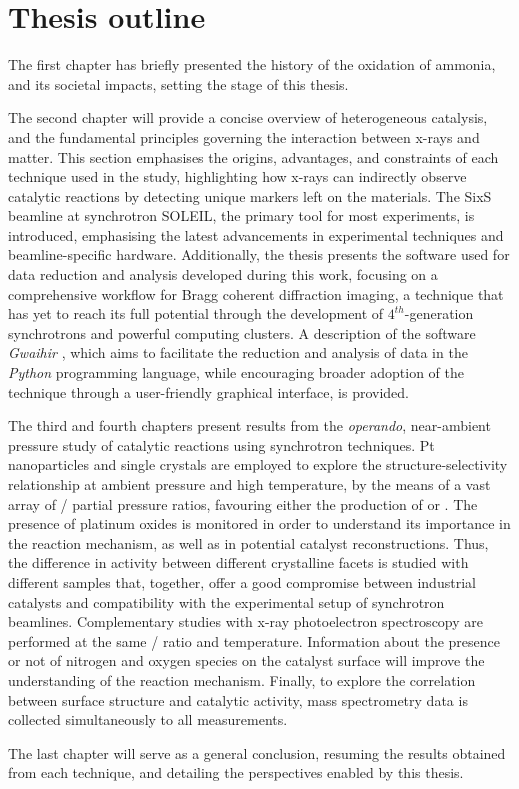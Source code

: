 \section{Thesis outline}

The first chapter has briefly presented the history of the oxidation of ammonia, and its societal impacts, setting the stage of this thesis.

The second chapter will provide a concise overview of heterogeneous catalysis, and the fundamental principles governing the interaction between x-rays and matter.
This section emphasises the origins, advantages, and constraints of each technique used in the study, highlighting how x-rays can indirectly observe catalytic reactions by detecting unique markers left on the materials.
The SixS beamline at synchrotron SOLEIL, the primary tool for most experiments, is introduced, emphasising the latest advancements in experimental techniques and beamline-specific hardware.
Additionally, the thesis presents the software used for data reduction and analysis developed during this work, focusing on a comprehensive workflow for Bragg coherent diffraction imaging, a technique that has yet to reach its full potential through the development of $4^{th}$-generation synchrotrons and powerful computing clusters.
A description of the software \textit{Gwaihir} \parencite{Simonne2022}, which aims to facilitate the reduction and analysis of data in the \textit{Python} programming language, while encouraging broader adoption of the technique through a user-friendly graphical interface, is provided.

The third and fourth chapters present results from the \textit{operando}, near-ambient pressure study of catalytic reactions using synchrotron techniques.
Pt nanoparticles and single crystals are employed to explore the structure-selectivity relationship at ambient pressure and high temperature, by the means of a vast array of / partial pressure ratios, favouring either the production of  or .
The presence of platinum oxides is monitored in order to understand its importance in the reaction mechanism, as well as in potential catalyst reconstructions.
Thus, the difference in activity between different crystalline facets is studied with different samples that, together, offer a good compromise between industrial catalysts and compatibility with the experimental setup of synchrotron beamlines.
Complementary studies with x-ray photoelectron spectroscopy are performed at the same / ratio and temperature.
Information about the presence or not of nitrogen and oxygen species on the catalyst surface will improve the understanding of the reaction mechanism.
Finally, to explore the correlation between surface structure and catalytic activity, mass spectrometry data is collected simultaneously to all measurements.

The last chapter will serve as a general conclusion, resuming the results obtained from each technique, and detailing the perspectives enabled by this thesis.